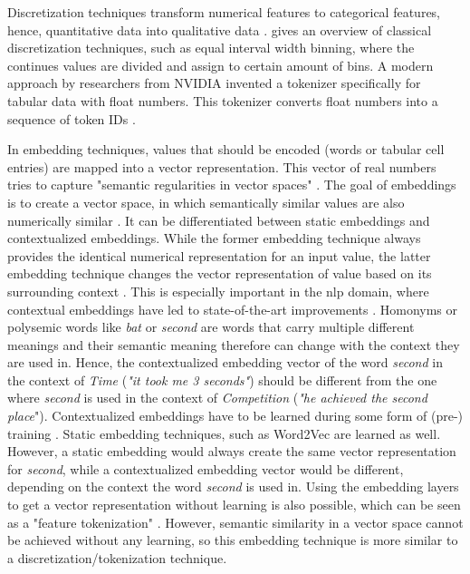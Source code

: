Discretization techniques transform numerical features to categorical features, hence, quantitative data into qualitative data \cite{garcia2016BigDataPreprocessing}. 
\cite{dougherty1995SupervisedUnsupervisedDiscretization} gives an overview of classical discretization techniques, such as equal interval width binning, where the continues values are divided and assign to certain amount of bins.
A modern approach by researchers from NVIDIA \cite{dong2022GeneratingSyntheticData} invented a tokenizer specifically for tabular data with float numbers. 
This tokenizer converts float numbers into a sequence of token IDs \cite{dong2022GeneratingSyntheticData}.

In embedding techniques, values that should be encoded (\eg words or tabular cell entries) are mapped into a vector representation. 
This vector of real numbers tries to capture "semantic regularities in vector spaces" \cite[p. 2]{pilaluisa2022ContextualWordEmbeddings}.
The goal of embeddings is to create a vector space, in which semantically similar values are also numerically similar \cite{pilaluisa2022ContextualWordEmbeddings}.
It can be differentiated between static embeddings and contextualized embeddings. 
While the former embedding technique always provides the identical numerical representation for an input value, the latter embedding technique changes the vector representation of value based on its surrounding context \cite{pilaluisa2022ContextualWordEmbeddings}.
This is especially important in the \gls{nlp} domain, where contextual embeddings have led to state-of-the-art improvements \cite{pilaluisa2022ContextualWordEmbeddings}.
Homonyms or polysemic words like \textit{bat} or \textit{second} are words that carry multiple different meanings and their semantic meaning therefore can change with the context they are used in.
Hence, the contextualized embedding vector of the word \textit{second} in the context of \textit{Time} (\eg \textit{"it took me 3 seconds"}) should be different from the one where \textit{second} is used in the context of \textit{Competition} (\eg \textit{"he achieved the second place}").
Contextualized embeddings have to be learned during some form of (pre-) training \cite{devlin2019BERTPretrainingDeep, iida2021TABBIEPretrainedRepresentations, deng2021TURLTableUnderstanding}. 
Static embedding techniques, such as Word2Vec \cite{mikolov2013DistributedRepresentationsWords} are learned as well.
However, a static embedding would always create the same vector representation for \textit{second}, while a contextualized embedding vector would be different, depending on the context the word \textit{second} is used in.
Using the embedding layers to get a vector representation without learning is also possible, which can be seen as a "feature tokenization" \cite{zheng2022DiffusionModelsMissing, gorishniy2021RevisitingDeepLearning}.
However, semantic similarity in a vector space cannot be achieved without any learning, so this embedding technique is more similar to a discretization/tokenization technique.

